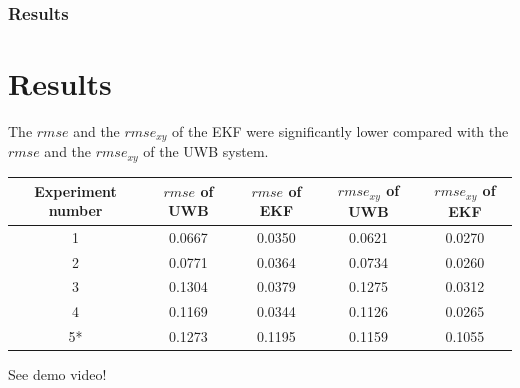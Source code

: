 \documentclass{beamer}[10]
\begin{document}
\begin{frame}
	\frametitle{Results}
	\section{Results}
	 The $\textit{rmse}$ and the $\textit{rmse}_{xy}$ of the EKF were significantly lower compared with the $\textit{rmse}$ and the $\textit{rmse}_{xy}$ of the UWB system.
	\tiny
	\begin{table}
		\begin{center}
			\begin{tabular}{c|c|c|c|c}
				Experiment number & $\textit{rmse}$ of UWB & $\textit{rmse}$ of EKF & $\textit{rmse}_{xy}$ of UWB & $\textit{rmse}_{xy}$ of EKF\\ 
				\hline 
				1 & 0.0667 & 0.0350 & 0.0621 & 0.0270 \\
				2 & 0.0771 & 0.0364 & 0.0734 & 0.0260 \\
				3 & 0.1304 & 0.0379 & 0.1275 & 0.0312 \\
				4 & 0.1169 & 0.0344 & 0.1126 & 0.0265 \\
				5* & 0.1273 & 0.1195 & 0.1159 & 0.1055
			\end{tabular}
		\end{center}
	\end{table}
	\normalsize
	See demo video!
\end{frame}
\end{document}
